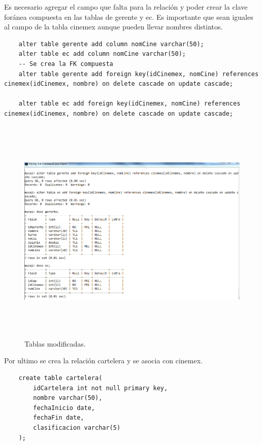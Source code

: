 \documentclass[12pt, titlepage]{article}
\begin{document}
    Es necesario agregar el campo que falta para la relación y poder crear la clave foránea compuesta en las tablas de gerente y ec. Es importante que sean iguales al campo de la tabla cinemex aunque pueden llevar nombres distintos.
     \begin{lstlisting}
    alter table gerente add column nomCine varchar(50);
    alter table ec add column nomCine varchar(50);
    -- Se crea la FK compuesta
    alter table gerente add foreign key(idCinemex, nomCine) references cinemex(idCinemex, nombre) on delete cascade on update cascade;
    
    alter table ec add foreign key(idCinemex, nomCine) references cinemex(idCinemex, nombre) on delete cascade on update cascade;
    \end{lstlisting}
    \begin{figure}[H]
        \begin{center}
            \includegraphics[width=16cm, height=11cm]{img/casi.png}
            \caption{Tablas modificadas.}
            \label{fig:modificaciones}
        \end{center}
    \end{figure}
    Por ultimo se crea la relación cartelera y se asocia con cinemex.
    \begin{lstlisting}
    create table cartelera(
        idCartelera int not null primary key,
        nombre varchar(50),
        fechaInicio date,
        fechaFin date,
        clasificacion varchar(5)
    );
    \end{lstlisting}
\end{document}
